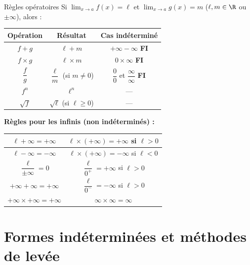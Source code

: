 \begin{propriete}{Règles opératoires}{}
	Si $\displaystyle\lim_{x\to a}f(x)=\ell$ et $\displaystyle\lim_{x\to a}g(x)=m$
	($\ell, m \in \R$ ou $\pm\infty$), alors :
	
	\begin{center}
		\renewcommand{\arraystretch}{2.0}
		\begin{tabular}{|c|c|c|}
			\hline
			\textbf{Opération} & \textbf{Résultat} & \textbf{Cas indéterminé} \\
			\hline
			$f + g$ & $\ell + m$ & $+\infty - \infty$ \quad \textbf{FI} \\
			\hline
			$f \times g$ & $\ell \times m$ & $0 \times \infty$ \quad \textbf{FI} \\
			\hline
			$\dfrac{f}{g}$ & $\dfrac{\ell}{m}$ (si $m\neq 0$)
			& $\dfrac{0}{0}$ et $\dfrac{\infty}{\infty}$ \quad \textbf{FI} \\
			\hline
			$f^n$ & $\ell^n$ & — \\
			\hline
			$\sqrt{f}$ & $\sqrt{\ell}$ (si $\ell\geq 0$) & — \\
			\hline
		\end{tabular}
	\end{center}
	
	\medskip
	\textbf{Règles pour les infinis (non indéterminés) :}
	\begin{center}
		\renewcommand{\arraystretch}{1.8}
		\begin{tabular}{|c|c|}
			\hline
			$\ell + \infty = +\infty$ & $\ell \times (+\infty) = +\infty$ si $\ell>0$ \\
			\hline
			$\ell - \infty = -\infty$ & $\ell \times (+\infty) = -\infty$ si $\ell<0$ \\
			\hline
			$\dfrac{\ell}{\pm\infty} = 0$ & $\dfrac{\ell}{0^+} = +\infty$ si $\ell>0$ \\
			\hline
			$+\infty + \infty = +\infty$ & $\dfrac{\ell}{0^-} = -\infty$ si $\ell>0$ \\
			\hline
			$+\infty \times +\infty = +\infty$ & $\infty \times \infty = \infty$ \\
			\hline
		\end{tabular}
	\end{center}
\end{propriete}

\section{Formes indéterminées et méthodes de levée}

